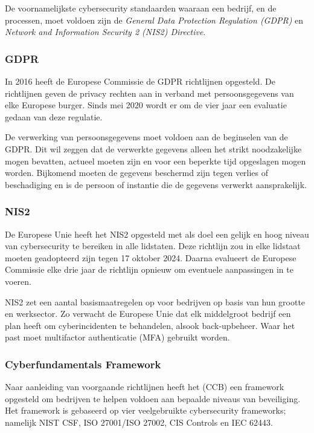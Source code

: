 De voornamelijkste cybersecurity standaarden waaraan een bedrijf, en de processen, moet voldoen zijn de \emph{General Data Protection Regulation (GDPR)} en \emph{Network and Information Security 2 (NIS2) Directive}.
\subsubsection{GDPR}

In 2016 heeft de Europese Commissie de GDPR richtlijnen opgesteld. De richtlijnen geven de privacy rechten aan in verband met persoonsgegevens van elke Europese burger. Sinds mei 2020 wordt er om de vier jaar een evaluatie gedaan van deze regulatie. \autocite{Office2016}

De verwerking van persoonsgegevens moet voldoen aan de beginselen van de GDPR. Dit wil zeggen dat de verwerkte gegevens alleen het strikt noodzakelijke mogen bevatten, actueel moeten zijn en voor een beperkte tijd opgeslagen mogen worden. Bijkomend moeten de gegevens beschermd zijn tegen verlies of beschadiging en is de persoon of instantie die de gegevens verwerkt aansprakelijk.

\subsubsection{NIS2}
De Europese Unie heeft het NIS2 opgesteld met als doel een gelijk en hoog niveau van cybersecurity te bereiken in alle lidstaten. Deze richtlijn zou in elke lidstaat moeten geadopteerd zijn tegen 17 oktober 2024. Daarna evalueert de Europese Commissie elke drie jaar de richtlijn opnieuw om eventuele aanpassingen in te voeren. \autocite{Office2022}

NIS2 zet een aantal basismaatregelen op voor bedrijven op basis van hun grootte en werksector. Zo verwacht de Europese Unie dat elk middelgroot bedrijf een plan heeft om cyberincidenten te behandelen, alsook back-upbeheer. Waar het past moet multifactor authenticatie (MFA) gebruikt worden.

\subsubsection{Cyberfundamentals Framework}
Naar aanleiding van voorgaande richtlijnen heeft het \textcite{FUNDAMENTALS2023} (CCB) een framework opgesteld om bedrijven te helpen voldoen aan bepaalde niveaus van beveiliging. Het framework is gebaseerd op vier veelgebruikte cybersecurity frameworks; namelijk NIST CSF, ISO 27001/ISO 27002, CIS Controls en IEC 62443.

